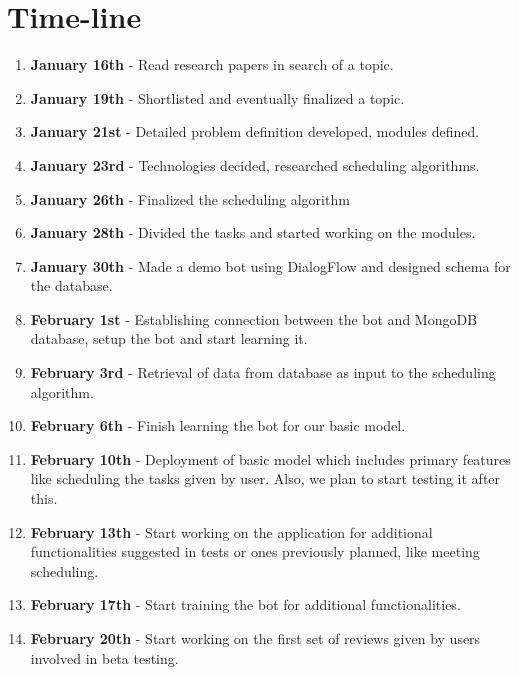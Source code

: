 \documentclass{sig-alternate-05-2015}
\begin{document}
\section{Time-line}
\begin{enumerate}
\item \textbf{January 16th} - Read research papers in search of a topic.

\item \textbf{January 19th} - Shortlisted and eventually finalized a topic.

\item \textbf{January 21st} - Detailed problem definition developed, modules defined.

\item \textbf{January 23rd} - Technologies decided, researched scheduling algorithms. 

\item \textbf{January 26th} - Finalized the scheduling algorithm 

\item \textbf{January 28th} - Divided the tasks and started working on the modules.

\item \textbf{January 30th} - Made a demo bot using DialogFlow and designed schema for the database.

\item \textbf{February 1st} - Establishing connection between the bot and MongoDB database, setup the bot and start learning it.

\item \textbf{February 3rd} - Retrieval of data from database as input to the scheduling algorithm.

\item \textbf{February 6th} - Finish learning the bot for our basic model.

\item \textbf{February 10th} - Deployment of basic model which includes primary features like scheduling the tasks given by user. Also, we plan to start testing it after this.

\item \textbf{February 13th} - Start working on the application for additional functionalities suggested in tests or ones previously planned, like meeting scheduling.

\item \textbf{February 17th} - Start training the bot for additional functionalities.

\item \textbf{February 20th} - Start working on the first set of reviews given by users involved in beta testing.


\end{enumerate}
\end{document}
